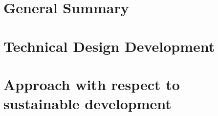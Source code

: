 \documentclass[11pt]{report}
\begin{document}
%
%



%
%



%
%

\tableofcontents

%
%

\chapter{General Summary}
\label{dseSummary}






%
%

\chapter{Technical Design Development}
\label{dse}







%
%

\chapter{Approach with respect to sustainable development}
\label{dseSustainable}

%
%
\end{document}
